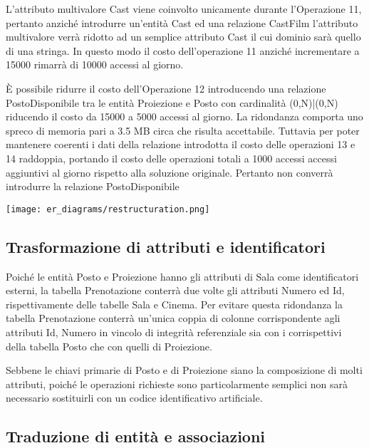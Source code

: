 L'attributo multivalore Cast viene coinvolto unicamente durante l'Operazione 11,
pertanto anziché introdurre un'entità Cast ed una relazione CastFilm
l'attributo multivalore verrà ridotto ad un semplice attributo Cast il cui
dominio sarà quello di una stringa.
In questo modo il costo dell'operazione 11 anziché incrementare a 15000
rimarrà di 10000 accessi al giorno.

È possibile ridurre il costo dell'Operazione 12 introducendo una relazione
PostoDisponibile tra le entità Proiezione e Posto con cardinalità (0,N)|(0,N)
riducendo il costo da 15000 a 5000 accessi al giorno.
La ridondanza comporta uno spreco di memoria pari a
3.5 MB circa che risulta accettabile.
Tuttavia per poter mantenere coerenti i dati della relazione introdotta il costo
delle operazioni 13 e 14 raddoppia, portando il costo delle operazioni totali a
1000 accessi accessi aggiuntivi al giorno rispetto alla soluzione originale.
Pertanto non converrà introdurre la relazione PostoDisponibile

\texttt{[image: er\_diagrams/restructuration.png]}

\subsection*{Trasformazione di attributi e identificatori}
%
%

Poiché le entità Posto e Proiezione hanno gli attributi di Sala come
identificatori esterni, la tabella Prenotazione conterrà due volte gli attributi
Numero ed Id, rispettivamente delle tabelle Sala e Cinema.
Per evitare questa ridondanza la tabella Prenotazione conterrà un'unica coppia
di colonne corrispondente agli attributi Id, Numero in vincolo di integrità
referenziale sia con i corrispettivi della tabella Posto che con quelli di
Proiezione.

Sebbene le chiavi primarie di Posto e di Proiezione siano la composizione di
molti attributi, poiché le operazioni richieste sono particolarmente semplici
non sarà necessario sostituirli con un codice identificativo artificiale.

\pagebreak
\subsection*{Traduzione di entità e associazioni}
%
%


